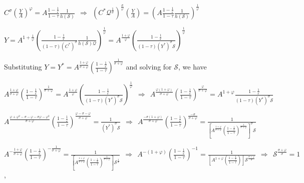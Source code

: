\documentclass[
]{article}
\begin{document}
\(\displaystyle C^\sigma \left( \frac{Y}{A} \right)^\varphi = A \frac{1-\frac{1}{\varepsilon}}{1-\tau} \frac{1}{h (\mathcal{S})} \ \ \Rightarrow \ \ \left( C^*\mathcal{Q}^\frac{1}{\sigma} \right)^\frac{\sigma}{\varphi} \left( \frac{Y}{A} \right) = \left(A \frac{1-\frac{1}{\varepsilon}}{1-\tau} \frac{1}{h (\mathcal{S})} \right)^\frac{1}{\varphi}\)

\(\displaystyle Y=A^{1+\frac{1}{\varphi}} \left( \frac{1-\frac{1}{\varepsilon}}{(1-\tau)(C^*)^\sigma} \frac{1}{ h (\mathcal{S})\mathcal{Q}} \right)^\frac{1}{\varphi} = A^{\frac{1+\varphi}{\varphi}} \left( \frac{1-\frac{1}{\varepsilon}}{(1-\tau)(Y^*)^\sigma \mathcal{S}} \right)^\frac{1}{\varphi}\)

Substituting
\(\displaystyle Y=Y^*=A^{\frac{1+\varphi}{\sigma+\varphi}} \left( \frac{1-\frac{1}{\varepsilon}}{1-\tau} \right)^{\frac{1}{\sigma+\varphi}}\)
and solving for \(\mathcal{S}\), we have

\(\displaystyle A^{\frac{1+\varphi}{\sigma+\varphi}} \left( \frac{1-\frac{1}{\varepsilon}}{1-\tau} \right)^{\frac{1}{\sigma+\varphi}}=A^{\frac{1+\varphi}{\varphi}} \left( \frac{1-\frac{1}{\varepsilon}}{(1-\tau)(Y^*)^\sigma \mathcal{S}} \right)^\frac{1}{\varphi} \ \ \Rightarrow \ \ A^{\frac{\varphi({1+\varphi})}{\sigma+\varphi}} \left( \frac{1-\frac{1}{\varepsilon}}{1-\tau} \right)^{\frac{\varphi}{\sigma+\varphi}}=A^{1+\varphi} \frac{1-\frac{1}{\varepsilon}}{(1-\tau)(Y^*)^\sigma \mathcal{S}}\)

\(\displaystyle A^{\frac{\varphi+\varphi^2-\sigma-\varphi -\sigma\varphi-\varphi^2}{\sigma+\varphi}} \left( \frac{1-\frac{1}{\varepsilon}}{1-\tau} \right)^{\frac{\varphi-\sigma-\varphi}{\sigma+\varphi}} = \frac{1}{(Y^*)^\sigma \mathcal{S}} \ \ \Rightarrow \ \  A^{\frac{-\sigma(1+\varphi)}{\sigma+\varphi}} \left( \frac{1-\frac{1}{\varepsilon}}{1-\tau} \right)^{\frac{-\sigma}{\sigma+\varphi}} = \frac{1}{\left[A^{\frac{1+\varphi}{\sigma+\varphi}} \left( \frac{1-\frac{1}{\varepsilon}}{1-\tau} \right)^{\frac{1}{\sigma+\varphi}} \right]^\sigma \mathcal{S}}\)

\(\displaystyle A^{-\frac{1+\varphi}{\sigma+\varphi}} \left( \frac{1-\frac{1}{\varepsilon}}{1-\tau} \right)^{-\frac{1}{\sigma+\varphi}} = \frac{1}{\left[A^{\frac{1+\varphi}{\sigma+\varphi}} \left( \frac{1-\frac{1}{\varepsilon}}{1-\tau} \right)^{\frac{1}{\sigma+\varphi}} \right] \mathcal{S}^{\frac{1}{\sigma}}} \ \ \Rightarrow \ \ A^{-(1+\varphi)} \left( \frac{1-\frac{1}{\varepsilon}}{1-\tau} \right)^{-1} = \frac{1}{\left[A^{1+\varphi}\left( \frac{1-\frac{1}{\varepsilon}}{1-\tau} \right) \right] \mathcal{S}^{\frac{\sigma+\varphi}{\sigma}}} \ \ \Rightarrow \ \ \mathcal{S}^{\frac{\sigma+\varphi}{\sigma}}=1\),
\end{document}
